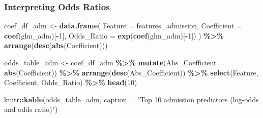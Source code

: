 \documentclass[
]{article}
\newenvironment{Shaded}{\begin{snugshade}}{\end{snugshade}}
\newcommand{\AttributeTok}[1]{\textcolor[rgb]{0.13,0.29,0.53}{#1}}
\newcommand{\DecValTok}[1]{\textcolor[rgb]{0.00,0.00,0.81}{#1}}
\newcommand{\FunctionTok}[1]{\textcolor[rgb]{0.13,0.29,0.53}{\textbf{#1}}}
\newcommand{\NormalTok}[1]{#1}
\newcommand{\OtherTok}[1]{\textcolor[rgb]{0.56,0.35,0.01}{#1}}
\newcommand{\SpecialCharTok}[1]{\textcolor[rgb]{0.81,0.36,0.00}{\textbf{#1}}}
\newcommand{\StringTok}[1]{\textcolor[rgb]{0.31,0.60,0.02}{#1}}
\begin{document}
\subsubsection{Interpreting Odds Ratios}\label{interpreting-odds-ratios}

\begin{Shaded}
\begin{Highlighting}[]
\NormalTok{coef\_df\_adm }\OtherTok{\textless{}{-}} \FunctionTok{data.frame}\NormalTok{(}
  \AttributeTok{Feature =}\NormalTok{ features\_admission,}
  \AttributeTok{Coefficient =} \FunctionTok{coef}\NormalTok{(glm\_adm)[}\SpecialCharTok{{-}}\DecValTok{1}\NormalTok{],}
  \AttributeTok{Odds\_Ratio =} \FunctionTok{exp}\NormalTok{(}\FunctionTok{coef}\NormalTok{(glm\_adm)[}\SpecialCharTok{{-}}\DecValTok{1}\NormalTok{])}
\NormalTok{) }\SpecialCharTok{\%\textgreater{}\%}
  \FunctionTok{arrange}\NormalTok{(}\FunctionTok{desc}\NormalTok{(}\FunctionTok{abs}\NormalTok{(Coefficient)))}

\NormalTok{odds\_table\_adm }\OtherTok{\textless{}{-}}\NormalTok{ coef\_df\_adm }\SpecialCharTok{\%\textgreater{}\%}
  \FunctionTok{mutate}\NormalTok{(}\AttributeTok{Abs\_Coefficient =} \FunctionTok{abs}\NormalTok{(Coefficient)) }\SpecialCharTok{\%\textgreater{}\%}
  \FunctionTok{arrange}\NormalTok{(}\FunctionTok{desc}\NormalTok{(Abs\_Coefficient)) }\SpecialCharTok{\%\textgreater{}\%}
  \FunctionTok{select}\NormalTok{(Feature, Coefficient, Odds\_Ratio) }\SpecialCharTok{\%\textgreater{}\%}
  \FunctionTok{head}\NormalTok{(}\DecValTok{10}\NormalTok{)}

\NormalTok{knitr}\SpecialCharTok{::}\FunctionTok{kable}\NormalTok{(odds\_table\_adm, }\AttributeTok{caption =} \StringTok{"Top 10 admission predictors (log{-}odds and odds ratio)"}\NormalTok{)}
\end{Highlighting}
\end{Shaded}
\end{document}
